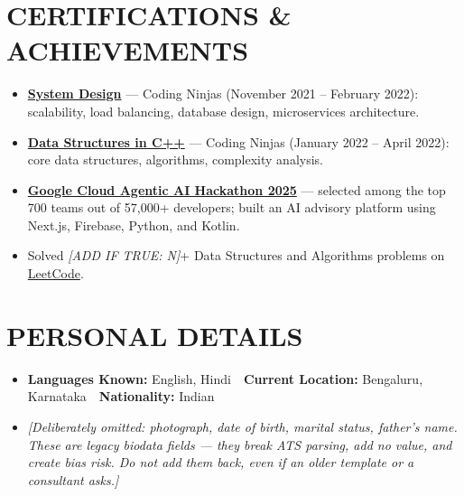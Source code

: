 \documentclass[letterpaper,11pt]{article}
\newcommand{\resumeItem}[1]{\item\small{{#1 \vspace{-2pt}}}}
\newcommand{\resumeItemListStart}{\begin{itemize}}
\newcommand{\resumeItemListEnd}{\end{itemize}\vspace{-5pt}}
\begin{document}
\vspace{-6pt}

\section{CERTIFICATIONS \& ACHIEVEMENTS}
    \vspace{2pt}
    \resumeItemListStart
        \resumeItem{\textbf{\href{http://ninjasfiles.s3.amazonaws.com/certificate18894980e4209379ac28665887f78da42bac5c2.pdf}{System Design}} — Coding Ninjas (November 2021 -- February 2022): scalability, load balancing, database design, microservices architecture.}
        \resumeItem{\textbf{\href{https://ninjasfiles.s3.amazonaws.com/certificate19853580c201378561a01f48ae87f59e9220db2.pdf}{Data Structures in C++}} — Coding Ninjas (January 2022 -- April 2022): core data structures, algorithms, complexity analysis.}
        \resumeItem{\textbf{\href{https://github.com/abhikumar002/Agentic-Gig-Project}{Google Cloud Agentic AI Hackathon 2025}} — selected among the top 700 teams out of 57,000+ developers; built an AI advisory platform using Next.js, Firebase, Python, and Kotlin.}
        \resumeItem{Solved \textit{[ADD IF TRUE: N]}+ Data Structures and Algorithms problems on \href{https://leetcode.com/u/sachinkumar6174/}{LeetCode}.}
    \resumeItemListEnd

\vspace{-6pt}

\section{PERSONAL DETAILS}
    \vspace{2pt}
    \resumeItemListStart
        \resumeItem{\textbf{Languages Known:} English, Hindi \,\textbar\, \textbf{Current Location:} Bengaluru, Karnataka \,\textbar\, \textbf{Nationality:} Indian}
        \resumeItem{\textit{\footnotesize [Deliberately omitted: photograph, date of birth, marital status, father's name. These are legacy biodata fields — they break ATS parsing, add no value, and create bias risk. Do not add them back, even if an older template or a consultant asks.]}}
    \resumeItemListEnd
\end{document}

